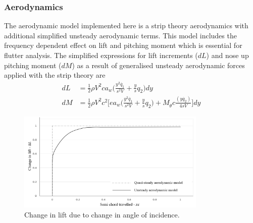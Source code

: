 \documentclass[11pt]{article}
\begin{document}
\subsubsection{Aerodynamics}
The aerodynamic model implemented here is a strip theory aerodynamics with additional simplified unsteady aerodynamic terms. This model includes the frequency dependent effect on lift and pitching moment which is essential for flutter analysis. The simplified expressions for lift increments ($dL$) and nose up pitching moment ($dM$) as a result of generalised unsteady aerodynamic forces applied with the strip theory are 
\begin{align}
dL &= \frac{1}{2}\rho V^2ca_w\Big( \frac{y^2\dot{q_1}}{s^2V}+\frac{y}{s}q_2\Big)dy\\
dM &= \frac{1}{2}\rho V^2 c^2\Big[ea_w\Big(\frac{y^2\dot{q_1}}{s^2V}+\frac{y}{s}q_2\Big)+M_{\dot{\theta}}c\frac{(y\dot{q_2})}{4sV}\Big]dy
\end{align}

\begin{figure}
    \centering
    \includegraphics[width = 9cm]{figures/wagner-func.png}
    \caption{Change in lift due to change in angle of incidence.}
    \label{fig:wagner}
\end{figure}
\end{document}
